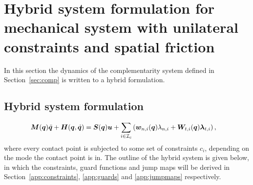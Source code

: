 \documentclass[../DC2017114Bouma.tex]{subfiles}
\begin{document}
\section{Hybrid system formulation for mechanical system with unilateral constraints and spatial friction}
In this section the dynamics of the complementarity system defined in Section~\ref{sec:comp} is written to a hybrid formulation. 

\subsection{Hybrid system formulation}
\begin{align}
&{\boldsymbol{M}}({\boldsymbol{q}})\ddot{{\boldsymbol{q}}} + {\boldsymbol{H}}({\boldsymbol{q}},\dot{{\boldsymbol{q}}}) = {\boldsymbol{S}}({\boldsymbol{q}}){\boldsymbol{u}} + \sum_{i\in\mathcal{I}_c}\left({\boldsymbol{w}}_{n,i}({\boldsymbol{q}})\lambda_{n,i} + {\boldsymbol{W}}_{t,i}({\boldsymbol{q}})\boldsymbol{\lambda}_{t,i} \right), \label{eq:hybriddyn}
\end{align}
where every contact point is subjected to some set of constraints $c_i$, depending on the mode the contact point is in. The outline of the hybrid system is given below, in which the constraints, guard functions and jump maps will be derived in Section~\ref{app:constraints}, \ref{app:guards} and \ref{app:jumpmaps} respectively.
\end{document}
